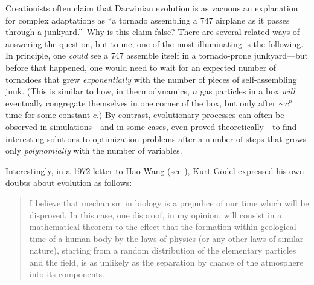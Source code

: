 \documentclass[12pt,onecolumn]{article}%
\begin{document}
Creationists often claim that Darwinian evolution is as vacuous an explanation
for complex adaptations as \textquotedblleft a tornado assembling a 747
airplane as it passes through a junkyard.\textquotedblright\  Why is this
claim false? There are several related ways of answering the question, but
to me, one of the most illuminating is the following. In principle, one
\textit{could} see a 747 assemble itself in a tornado-prone junkyard---but
before that happened, one would need to wait for an expected number of
tornadoes that grew \textit{exponentially} with the number of pieces of
self-assembling junk. (This is similar to how, in thermodynamics, $n$ gas
particles in a box \textit{will} eventually congregate themselves in one
corner of the box, but only after $\sim c^{n}$ time for some constant $c$.)
 By contrast, evolutionary processes can often be observed in
simulations---and in some cases, even proved theoretically---to find
interesting solutions to optimization problems after a number of steps that
grows only \textit{polynomially} with the number of variables.

Interestingly, in a 1972 letter to Hao Wang (see \cite[p. 192]{wang}), Kurt
G\"{o}del expressed his own doubts about evolution as follows:

\begin{quotation}
\noindent I believe that mechanism in biology is a prejudice of our time which
will be disproved. In this case, one disproof, in my opinion, will consist
in a mathematical theorem to the effect that the formation within geological
time of a human body by the laws of physics (or any other laws of similar
nature), starting from a random distribution of the elementary particles and
the field, is as unlikely as the separation by chance of the atmosphere into
its components.
\end{quotation}
\end{document}
